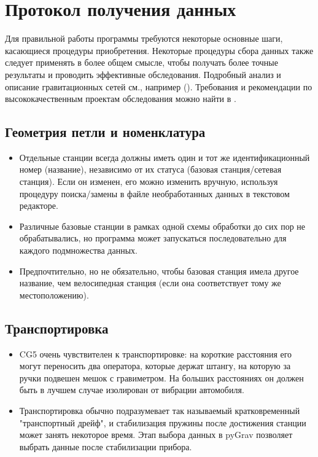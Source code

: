 \chapter[Протокол получения данных]{Протокол получения данных}
\label{chap:acquisition_protocol}

Для правильной работы программы требуются некоторые основные шаги, касающиеся
процедуры приобретения. Некоторые процедуры сбора данных также следует применять
в более общем смысле, чтобы получать более точные результаты и проводить
эффективные обследования. Подробный анализ и описание гравитационных сетей см.,
например (\cite{lambert_nano_1977, torge_1980}). Требования и рекомендации по
высококачественным проектам обследования можно найти в \cite{seigel_1995}.

\section[Геометрия петли и номенклатура]{Геометрия петли и номенклатура}
\label{sec:loop_geometries_and_nomenclature}

\begin{itemize}
    \item Отдельные станции всегда должны иметь один и тот же идентификационный
    номер (название), независимо от их статуса (базовая станция/сетевая
    станция). Если он изменен, его можно изменить вручную, используя процедуру
    поиска/замены в файле необработанных данных в текстовом редакторе.
    
    \item Различные базовые станции в рамках одной схемы обработки до сих пор не
    обрабатывались, но программа может запускаться последовательно для каждого
    подмножества данных.
    
    \item Предпочтительно, но не обязательно, чтобы базовая станция имела другое
    название, чем велосипедная станция (если она соответствует тому же
    местоположению).
    
\end{itemize}

\section[Транспортировка]{Транспортировка}
\label{sec:transportation}

\begin{itemize}
    \item CG5 очень чувствителен к транспортировке: на короткие расстояния его
    могут переносить два оператора, которые держат штангу, на которую за ручки
    подвешен мешок с гравиметром. На больших расстояниях он должен быть в лучшем
    случае изолирован от вибрации автомобиля.

    \item Транспортировка обычно подразумевает так называемый кратковременный
    "транспортный дрейф", и стабилизация пружины после достижения станции может
    занять некоторое время. Этап выбора данных в pyGrav позволяет выбрать данные
    после стабилизации прибора.

\end{itemize}

